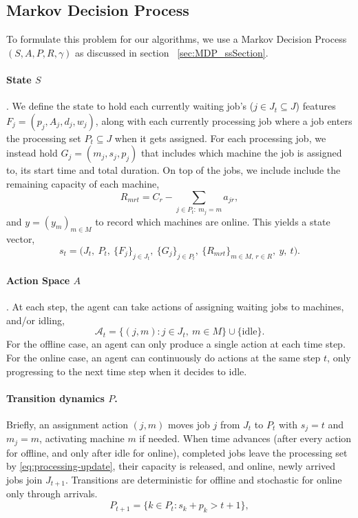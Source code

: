 \documentclass[12pt]{article}
\begin{document}
\subsection{Markov Decision Process}
To formulate this problem for our algorithms, we use a Markov Decision Process $(S,A,P,R,\gamma)$ as discussed in section ~\ref{sec:MDP_ssSection}.
\newline

\paragraph{State $S$}. We define the state to hold each currently waiting job's ($j\in J_t\subseteq J$) features $F_j=(p_j, A_j, d_j, w_j)$, along with each currently processing job where a job enters the processing set $P_t\subseteq J$ when it gets assigned. For each processing job, we instead hold $G_j=(m_j,s_j,p_j)$ that includes which machine the job is assigned to, its start time and total duration. On top of the jobs, we include include the remaining capacity of each machine,
\begin{equation}\label{eq:remaining-capacity}
    R_{mrt} = C_r - \sum_{j \in P_t:\ m_j = m} a_{jr},
\end{equation}
and $y=(y_m)_{m\in M}$ to record which machines are online. This yields a state vector,
\begin{equation}\label{eq:state}
    s_t = \big(J_t,\ P_t,\ \{F_j\}_{j \in J_t},\ \{G_j\}_{j \in P_t},\ \{R_{mrt}\}_{m \in M,\, r \in R},\ y,\ t\big).
\end{equation}
\paragraph{Action Space $A$}. At each step, the agent can take actions of assigning waiting jobs to machines, and/or idling,
\begin{equation}\label{eq:action-flat}
    \mathcal{A}_t = \{(j, m) : j \in J_t,\ m \in M\} \cup \{\text{idle}\}.
\end{equation}
For the offline case, an agent can only produce a single action at each time step. For the online case, an agent can continuously do actions at the same step $t$, only progressing to the next time step when it decides to idle. 

\paragraph{Transition dynamics $P$.} Briefly, an assignment action $(j, m)$ moves job $j$ from $J_t$ to $P_t$ with $s_j = t$ and $m_j = m$, activating machine $m$ if needed. When time advances (after every action for offline, and only after idle for online), completed jobs leave the processing set by \cref{eq:processing-update}, their capacity is released, and online, newly arrived jobs join $J_{t+1}$. Transitions are deterministic for offline and stochastic for online only through arrivals.
\begin{equation}\label{eq:processing-update}
    P_{t+1} = \{k \in P_t : s_k + p_k > t + 1\},
\end{equation}
\end{document}
